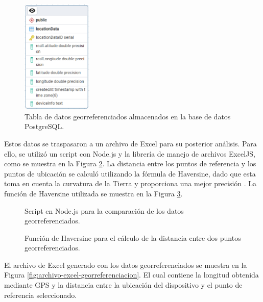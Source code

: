 \begin{figure}[H]
    \centering
    \includegraphics[width=0.3\textwidth]{chapters/III-resultados-y-discusion/resources/images/tabla-georreferenciacion.png}
    \caption{Tabla de datos georreferenciados almacenados en la base de datos PostgreSQL.}
    \label{fig:tabla-georreferenciacion}
\end{figure}

Estos datos se traspasaron a un archivo de Excel para su posterior análisis. Para ello, se utilizó un script con
Node.js y la librería de manejo de archivos ExcelJS, como se muestra en la Figura \ref{fig:script-exceljs}. La distancia entre
los puntos de referencia y los puntos de ubicación se calculó utilizando la fórmula de Haversine, dado que esta toma en cuenta
la curvatura de la Tierra y proporciona una mejor precisión \cite{basyirDeterminationNearestEmergency2017}. La función de
Haversine utilizada se muestra en la Figura \ref{fig:script-haversine}.

\begin{figure}[H]
    
    \caption{Script en Node.js para la comparación de los datos georreferenciados.}
    \label{fig:script-exceljs}
\end{figure}

\begin{figure}[H]
    
    \caption{Función de Haversine para el cálculo de la distancia entre dos puntos georreferenciados.}
    \label{fig:script-haversine}
\end{figure}

El archivo de Excel generado con los datos georreferenciados se muestra en la Figura \ref{fig:archivo-excel-georreferenciacion}. El cual
contiene la longitud obtenida mediante GPS y la distancia entre la ubicación del dispositivo y el punto de referencia seleccionado.

